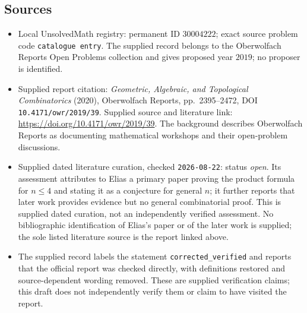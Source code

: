 \documentclass[11pt]{article}
\begin{document}
\subsection{Sources}
\begin{itemize}
\item Local UnsolvedMath registry: permanent ID \(30004222\); exact source problem code \texttt{catalogue entry}. The supplied record belongs to the Oberwolfach Reports Open Problems collection and gives proposed year \(2019\); no proposer is identified.
\item Supplied report citation: \emph{Geometric, Algebraic, and Topological Combinatorics} (2020), Oberwolfach Reports, pp.\ 2395--2472, DOI \texttt{10.4171/owr/2019/39}. Supplied source and literature link: \url{https://doi.org/10.4171/owr/2019/39}. The background describes Oberwolfach Reports as documenting mathematical workshops and their open-problem discussions.
\item Supplied dated literature curation, checked \texttt{2026-08-22}: status \emph{open}. Its assessment attributes to Elias a primary paper proving the product formula for \(n\leq4\) and stating it as a conjecture for general \(n\); it further reports that later work provides evidence but no general combinatorial proof. This is supplied dated curation, not an independently verified assessment. No bibliographic identification of Elias's paper or of the later work is supplied; the sole listed literature source is the report linked above.
\item The supplied record labels the statement \texttt{corrected\_verified} and reports that the official report was checked directly, with definitions restored and source-dependent wording removed. These are supplied verification claims; this draft does not independently verify them or claim to have visited the report.
\end{itemize}
\end{document}
